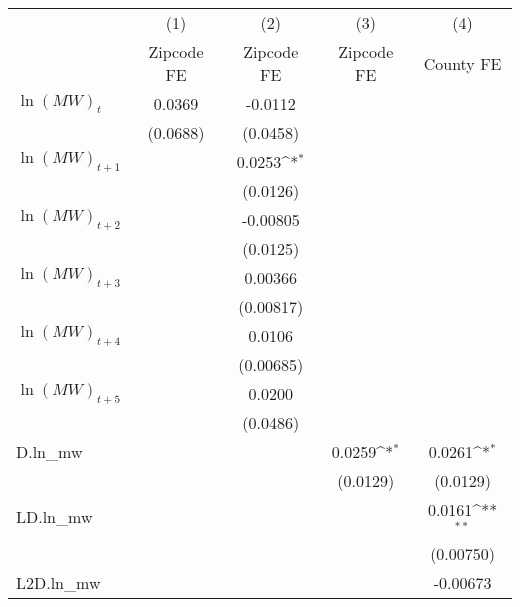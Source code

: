 {
\def\sym#1{\ifmmode^{#1}\else\(^{#1}\)\fi}
\begin{tabular}{l*{4}{c}}
\hline\hline
          &\multicolumn{1}{c}{(1)}&\multicolumn{1}{c}{(2)}&\multicolumn{1}{c}{(3)}&\multicolumn{1}{c}{(4)}\\
          &\multicolumn{1}{c}{Zipcode FE}&\multicolumn{1}{c}{Zipcode FE}&\multicolumn{1}{c}{Zipcode FE}&\multicolumn{1}{c}{County FE}\\
\hline
$\ln(MW)_{t}$&   0.0369         &  -0.0112         &                  &                  \\
          & (0.0688)         & (0.0458)         &                  &                  \\
[1em]
$\ln(MW)_{t+1}$&                  &   0.0253\sym{*}  &                  &                  \\
          &                  & (0.0126)         &                  &                  \\
[1em]
$\ln(MW)_{t+2}$&                  & -0.00805         &                  &                  \\
          &                  & (0.0125)         &                  &                  \\
[1em]
$\ln(MW)_{t+3}$&                  &  0.00366         &                  &                  \\
          &                  &(0.00817)         &                  &                  \\
[1em]
$\ln(MW)_{t+4}$&                  &   0.0106         &                  &                  \\
          &                  &(0.00685)         &                  &                  \\
[1em]
$\ln(MW)_{t+5}$&                  &   0.0200         &                  &                  \\
          &                  & (0.0486)         &                  &                  \\
[1em]
D.ln_mw   &                  &                  &   0.0259\sym{*}  &   0.0261\sym{*}  \\
          &                  &                  & (0.0129)         & (0.0129)         \\
[1em]
LD.ln_mw  &                  &                  &                  &   0.0161\sym{**} \\
          &                  &                  &                  &(0.00750)         \\
[1em]
L2D.ln_mw &                  &                  &                  & -0.00673         \\

\end{tabular}}
